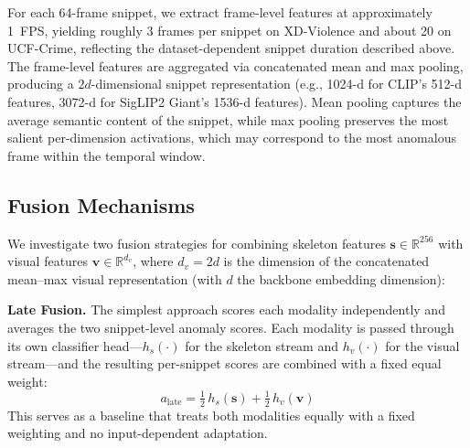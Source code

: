 \documentclass[sigconf]{acmart}
\begin{document}
For each 64-frame snippet, we extract frame-level features at approximately 1~FPS, yielding roughly 3 frames per snippet on XD-Violence and about 20 on UCF-Crime, reflecting the dataset-dependent snippet duration described above. The frame-level features are aggregated via concatenated mean and max pooling, producing a $2d$-dimensional snippet representation (e.g., 1024-d for CLIP's 512-d features, 3072-d for SigLIP2 Giant's 1536-d features). Mean pooling captures the average semantic content of the snippet, while max pooling preserves the most salient per-dimension activations, which may correspond to the most anomalous frame within the temporal window.

\subsection{Fusion Mechanisms}

We investigate two fusion strategies for combining skeleton features $\mathbf{s} \in \mathbb{R}^{256}$ with visual features $\mathbf{v} \in \mathbb{R}^{d_v}$, where $d_v = 2d$ is the dimension of the concatenated mean--max visual representation (with $d$ the backbone embedding dimension):

\textbf{Late Fusion.} The simplest approach scores each modality independently and averages the two snippet-level anomaly scores. Each modality is passed through its own classifier head---$h_s(\cdot)$ for the skeleton stream and $h_v(\cdot)$ for the visual stream---and the resulting per-snippet scores are combined with a fixed equal weight:
\begin{equation}
    a_{\text{late}} = \tfrac{1}{2}\, h_s(\mathbf{s}) + \tfrac{1}{2}\, h_v(\mathbf{v})
\end{equation}
This serves as a baseline that treats both modalities equally with a fixed weighting and no input-dependent adaptation.
\end{document}
